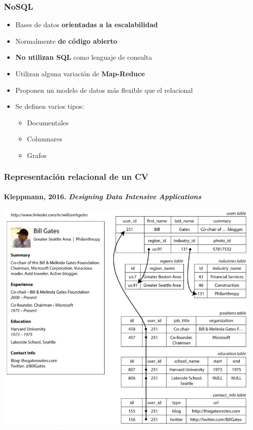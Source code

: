 \documentclass[14pt]{beamer}
\begin{document}
\begin{frame}
  \frametitle{NoSQL}
\begin{itemize}
\item Bases de datos {\bf orientadas a la escalabilidad}
\item Normalmente {\bf de código abierto}
\item {\bf No utilizan SQL} como lenguaje de consulta
\item Utilizan alguna variación de {\bf Map-Reduce}
\item Proponen un modelo de datos más flexible que el relacional
\item Se definen varios tipos:
  \begin{itemize}
  \item Documentales
  \item Columnares
  \item Grafos
  \end{itemize}
  \end{itemize}
\end{frame}


\begin{frame}
  \frametitle{Representación relacional de un CV}
\framesubtitle{Kleppmann, 2016. \emph{Designing Data Intensive Applications}}
  \centering\includegraphics[height=.81\textheight]{img/gates}
\end{frame}
\end{document}
